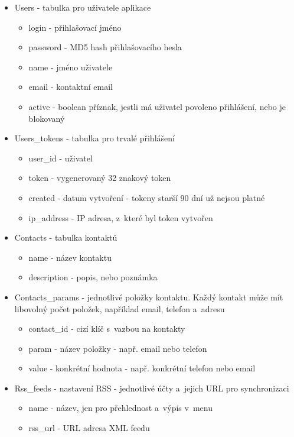 \documentclass[bc,male,html,dept460]{diploma}				%
\begin{document}
\begin{itemize}
  \item Users - tabulka pro uživatele aplikace
    \begin{itemize}
      \item login - přihlašovací jméno
      \item password - MD5 hash přihlašovacího hesla
      \item name - jméno uživatele
      \item email - kontaktní email
      \item active - boolean příznak, jestli má uživatel povoleno přihlášení, nebo je blokovaný
    \end{itemize}

  \item Users\_tokens - tabulka pro trvalé přihlášení
    \begin{itemize}
      \item user\_id - uživatel
      \item token - vygenerovaný 32 znakový token
      \item created - datum vytvoření - tokeny starší 90 dní už nejsou platné
      \item ip\_address - IP adresa, z~které byl token vytvořen
    \end{itemize}
    
  \item Contacts - tabulka kontaktů
    \begin{itemize}
      \item name - název kontaktu
      \item description - popis, nebo poznámka
    \end{itemize}

  \item Contacts\_params - jednotlivé položky kontaktu. Každý kontakt může mít libovolný počet položek, například email, telefon a~adresu
    \begin{itemize}
      \item contact\_id - cizí klíč s~vazbou na kontakty
      \item param - název položky - např. email nebo telefon
      \item value - konkrétní hodnota - např. konkrétní telefon nebo email
    \end{itemize}

  \item Rss\_feeds - nastavení RSS - jednotlivé účty a~jejich URL pro synchronizaci
    \begin{itemize}
      \item name - název, jen pro přehlednost a~výpis v~menu
      \item rss\_url - URL adresa XML feedu
    \end{itemize}


\end{itemize}
\end{document}
